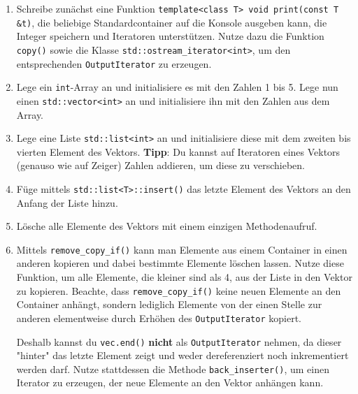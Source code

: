\begin{enumerate}
\item 
Schreibe zunächst eine Funktion \texttt{template<class T> void print(const T \&t)}, die beliebige Standardcontainer auf die Konsole ausgeben kann, die Integer speichern und Iteratoren unterstützen.
Nutze dazu die Funktion \texttt{copy()} sowie die Klasse \texttt{std::ostream\_iterator<int>}, um den entsprechenden \texttt{OutputIterator} zu erzeugen.

\item
Lege ein \texttt{int}-Array an und initialisiere es mit den Zahlen 1 bis 5.
Lege nun einen \texttt{std::vector<int>} an und initialisiere ihn mit den Zahlen aus dem Array.

\item
Lege eine Liste \texttt{std::list<int>} an und initialisiere diese mit dem zweiten bis vierten Element des Vektors.
\textbf{Tipp}: Du kannst auf Iteratoren eines Vektors (genauso wie auf Zeiger) Zahlen addieren, um diese zu verschieben.

\item
Füge mittels \texttt{std::list<T>::insert()} das letzte Element des Vektors an den Anfang der Liste hinzu.

\item
Lösche alle Elemente des Vektors mit einem einzigen Methodenaufruf.

\item
Mittels \texttt{remove\_copy\_if()} kann man Elemente aus einem Container in einen anderen kopieren und dabei bestimmte Elemente löschen lassen.
Nutze diese Funktion, um alle Elemente, die kleiner sind als 4, aus der Liste in den Vektor zu kopieren. Beachte, dass \texttt{remove\_copy\_if()} keine neuen Elemente an den Container anhängt, sondern lediglich Elemente von der einen Stelle zur anderen elementweise durch Erhöhen des \texttt{OutputIterator} kopiert.

Deshalb kannst du \texttt{vec.end()} \textbf{nicht} als \texttt{OutputIterator} nehmen, da dieser "{}hinter"{} das letzte Element zeigt und weder dereferenziert noch inkrementiert werden darf. Nutze stattdessen die Methode \texttt{back\_inserter()}, um einen Iterator zu erzeugen, der neue Elemente an den Vektor anhängen kann.
\end{enumerate}
